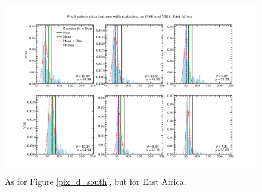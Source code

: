 \begin{figure}
  \centering
  \includegraphics[width=\textwidth]{figures/pixel_distributions_stats_eastafrica}
  \caption{As for Figure \ref{pix_d_south}, but for East Africa.}
  \label{fig:pix_d_east}
\end{figure}

